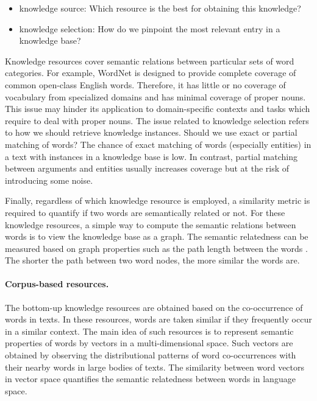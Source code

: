 \begin{itemize}
\item knowledge source: Which resource is the best for obtaining this knowledge? 
\item knowledge selection: How do we pinpoint the most relevant entry in a knowledge base?
\end{itemize}

Knowledge resources cover semantic relations between particular sets of word categories.  
For example, WordNet is designed to provide complete coverage of common open-class English words. 
Therefore, it has little or no coverage of vocabulary from specialized domains and has minimal coverage of proper nouns. 
This issue may hinder its application to domain-specific contexts and tasks which require to deal with proper nouns. 
The issue related to knowledge selection refers to how we should retrieve knowledge instances. Should we use exact or partial matching of words?   
The chance of exact matching of words (especially entities) in a text with instances in a knowledge base is low.  
In contrast, partial matching between arguments and entities usually increases coverage but at the risk of introducing some noise. 

Finally, regardless of which knowledge resource is employed, a similarity metric is required to quantify if two words are semantically related or not.  
For these knowledge resources, a simple way to compute the semantic relations between words is to view the knowledge base as a graph. 
The semantic relatedness can be measured based on graph properties such as the path length between the words \cite{budanitsky06}. 
The shorter the path between two word nodes, the more similar the words are. 

\paragraph{Corpus-based resources.} 
The bottom-up knowledge resources are obtained based on the co-occurrence of words in texts.  
In these resources, words are taken similar if they frequently occur in a similar context. 
The main idea of such resources is to represent semantic properties of words by vectors in a \mbox{multi-dimensional} space. 
Such vectors are obtained by observing the distributional patterns of word co-occurrences with their nearby words in large bodies of texts. 
The similarity between word vectors in vector space quantifies the semantic relatedness between words in language space. 

